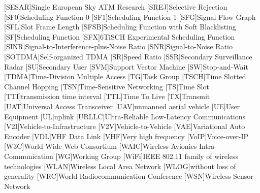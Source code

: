 \begin{acronym}
[SESAR]{Single European Sky ATM Research}
[SREJ]{Selective Rejection}
[SF0]{Scheduling Function 0}
[SF1]{Scheduling Function 1}
[SFG]{Signal Flow Graph}
[SFL]{Slot Frame Length}
[SFSB]{Scheduling Function with Soft Blacklisting}
[SF]{Scheduling Function}
[SFX]{6TiSCH Experimental Scheduling Function}
[SINR]{Signal-to-Interference-plus-Noise Ratio}
[SNR]{Signal-to-Noise Ratio}
[SOTDMA]{Self-organized TDMA}
[SR]{Speed Ratio}
[SSR]{Secondary Surveillance Radar}
[SU]{Secondary User}
[SVM]{Support Vector Machine}
[SW]{Stop-and-Wait}
[TDMA]{Time-Division Multiple Access}
[TG]{Task Group}
[TSCH]{Time Slotted Channel Hopping}
[TSN]{Time-Sensitive Networking}
[TS]{Time Slot}
[TTI]{transmission time interval}
[TTL]{Time To Live}
[TX]{Transmit}
[UAT]{Universal Access Transceiver}
[UAV]{unmanned aerial vehicle}
[UE]{User Equipment}
[UL]{uplink}
[URLLC]{Ultra-Reliable Low-Latency Communications}
[V2I]{Vehicle-to-Infrastructure}
[V2V]{Vehicle-to-Vehicle}
[VAE]{Variational Auto Encoder}
[VDL]{VHF Data Link}
[VHF]{Very high frequency}
[VoIP]{Voice-over-IP}
[W3C]{World Wide Web Consortium}
[WAIC]{Wireless Avionics Intra-Communication}
[WG]{Working Group}
[WiFi]{IEEE 802.11 family of wireless technologies}
[WLAN]{Wireless Local Area Network}
[WLOG]{without loss of generality}
[WRC]{World Radiocommunication Conference}
[WSN]{Wireless Sensor Network}

\end{acronym}